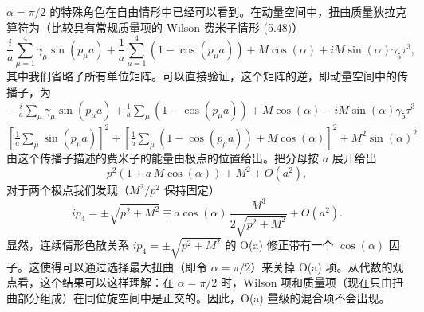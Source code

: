 $\alpha = \pi/2$ 的特殊角色在自由情形中已经可以看到。在动量空间中，扭曲质量狄拉克算符为（比较具有常规质量项的 Wilson 费米子情形 (5.48)）
\begin{equation}
  \frac{i}{a}\sum_{\mu=1}^{4}\gamma_\mu\sin(p_\mu a)
  + \frac{1}{a}\sum_{\mu=1}^{4}(1-\cos(p_\mu a))
  + M\cos(\alpha) + iM\sin(\alpha)\gamma_5\tau^3 ,
\end{equation}
其中我们省略了所有单位矩阵。可以直接验证，这个矩阵的逆，即动量空间中的传播子，为
\begin{equation}
  \frac{-\frac{i}{a}\sum_\mu\gamma_\mu\sin(p_\mu a)
  + \frac{1}{a}\sum_\mu(1-\cos(p_\mu a)) + M\cos(\alpha)
  - iM\sin(\alpha)\gamma_5\tau^3}
  {\left[\frac{1}{a}\sum_\mu\sin(p_\mu a)\right]^2
  + \left[\frac{1}{a}\sum_\mu(1-\cos(p_\mu a)) + M\cos(\alpha)\right]^2
  + M^2\sin(\alpha)^2}
\end{equation}
由这个传播子描述的费米子的能量由极点的位置给出。把分母按 $a$ 展开给出
\begin{equation}
  p^2\left(1 + a\,M\cos(\alpha)\right) + M^2 + O(a^2) ,
\end{equation}
对于两个极点我们发现（$M^2/p^2$ 保持固定）
\begin{equation}
  ip_4 = \pm\sqrt{p^2 + M^2}
  \mp a\cos(\alpha)\,\frac{M^3}{2\sqrt{p^2 + M^2}} + O(a^2) .
\end{equation}
显然，连续情形色散关系 $ip_4 = \pm\sqrt{p^2 + M^2}$ 的 O(a) 修正带有一个 $\cos(\alpha)$ 因子。这使得可以通过选择最大扭曲（即令 $\alpha = \pi/2$）来关掉 O(a) 项。从代数的观点看，这个结果可以这样理解：在 $\alpha = \pi/2$ 时，Wilson 项和质量项（现在只由扭曲部分组成）在同位旋空间中是正交的。因此，O(a) 量级的混合项不会出现。


